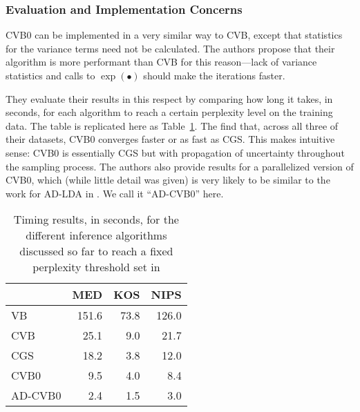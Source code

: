 \documentclass[11pt]{article}
\begin{document}
\subsubsection{Evaluation and Implementation Concerns}
CVB0 can be implemented in a very similar way to CVB, except that
statistics for the variance terms need not be calculated. The authors
propose that their algorithm is more performant than CVB for this
reason---lack of variance statistics and calls to $\exp(\bullet)$ should
make the iterations faster.

They evaluate their results in this respect by comparing how long it takes,
in seconds, for each algorithm to reach a certain perplexity level on the
training data. The table is replicated here as Table~\ref{table:cvb0time}.
The find that, across all three of their datasets, CVB0 converges faster or
as fast as CGS. This makes intuitive sense: CVB0 is essentially CGS but
with propagation of uncertainty throughout the sampling process. The
authors also provide results for a parallelized version of CVB0, which
(while little detail was given) is very likely to be similar to the work
for AD-LDA in \citet{Newman:2009:ADLDA}. We call it ``AD-CVB0'' here.

\begin{table}[h]
  \begin{center}
    \begin{tabular}{l|r|r|r}
      & \textbf{MED} & \textbf{KOS} & \textbf{NIPS}\\\hline
      VB & 151.6 & 73.8 & 126.0\\
      CVB & 25.1 & 9.0 & 21.7\\
      CGS & 18.2 & 3.8 & 12.0\\
      CVB0 & 9.5 & 4.0 & 8.4\\
      AD-CVB0 & 2.4 & 1.5 & 3.0\\
    \end{tabular}
  \end{center}
  \caption{Timing results, in seconds, for the different inference algorithms discussed
    so far to reach a fixed perplexity threshold set
    in \citet{Asuncion:2009:onsmoothing}}
  \label{table:cvb0time}
\end{table}

\end{document}
